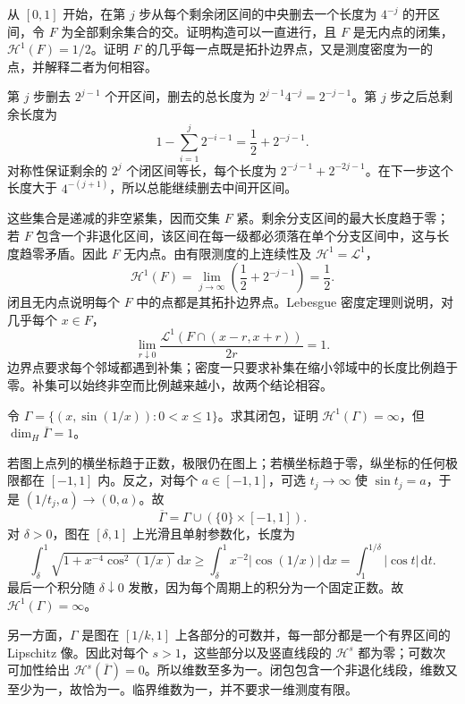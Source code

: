 \begin{exercise}\label{g3:ex:fat-cantor-density}
	从 \([0,1]\) 开始，在第 \(j\) 步从每个剩余闭区间的中央删去一个长度为 \(4^{-j}\) 的开区间，令 \(F\) 为全部剩余集合的交。证明构造可以一直进行，且 \(F\) 是无内点的闭集，\(\mathcal H^1(F)=1/2\)。证明 \(F\) 的几乎每一点既是拓扑边界点，又是测度密度为一的点，并解释二者为何相容。
\end{exercise}
\begin{solution}
	第 \(j\) 步删去 \(2^{j-1}\) 个开区间，删去的总长度为
	\(2^{j-1}4^{-j}=2^{-j-1}\)。第 \(j\) 步之后总剩余长度为
	\[
		1-\sum_{i=1}^j2^{-i-1}=\frac12+2^{-j-1}.
	\]
	对称性保证剩余的 \(2^j\) 个闭区间等长，每个长度为
	\(2^{-j-1}+2^{-2j-1}\)。在下一步这个长度大于 \(4^{-(j+1)}\)，所以总能继续删去中间开区间。

	这些集合是递减的非空紧集，因而交集 \(F\) 紧。剩余分支区间的最大长度趋于零；若 \(F\) 包含一个非退化区间，该区间在每一级都必须落在单个分支区间中，这与长度趋零矛盾。因此 \(F\) 无内点。由有限测度的上连续性及 \(\mathcal H^1=\mathcal L^1\)，
	\[
		\mathcal H^1(F)=\lim_{j\to\infty}\left(\frac12+2^{-j-1}\right)=\frac12.
	\]
	闭且无内点说明每个 \(F\) 中的点都是其拓扑边界点。Lebesgue 密度定理则说明，对几乎每个 \(x\in F\)，
	\[
		\lim_{r\downarrow0}\frac{\mathcal L^1(F\cap(x-r,x+r))}{2r}=1.
	\]
	边界点要求每个邻域都遇到补集；密度一只要求补集在缩小邻域中的长度比例趋于零。补集可以始终非空而比例越来越小，故两个结论相容。
\end{solution}

\begin{exercise}\label{g3:ex:oscillating-graph-length}
	令 \(\Gamma=\{(x,\sin(1/x)):0<x\le1\}\)。求其闭包，证明
	\(\mathcal H^1(\Gamma)=\infty\)，但 \(\dim_H\overline\Gamma=1\)。
\end{exercise}
\begin{solution}
	若图上点列的横坐标趋于正数，极限仍在图上；若横坐标趋于零，纵坐标的任何极限都在 \([-1,1]\) 内。反之，对每个 \(a\in[-1,1]\)，可选 \(t_j\to\infty\) 使 \(\sin t_j=a\)，于是 \((1/t_j,a)\to(0,a)\)。故
	\[
		\overline\Gamma=\Gamma\cup(\{0\}\times[-1,1]).
	\]
	对 \(\delta>0\)，图在 \([\delta,1]\) 上光滑且单射参数化，长度为
	\[
		\int_\delta^1\sqrt{1+x^{-4}\cos^2(1/x)}\,\mathrm dx
		\ge\int_\delta^1x^{-2}|\cos(1/x)|\,\mathrm dx
		=\int_1^{1/\delta}|\cos t|\,\mathrm dt.
	\]
	最后一个积分随 \(\delta\downarrow0\) 发散，因为每个周期上的积分为一个固定正数。故 \(\mathcal H^1(\Gamma)=\infty\)。

	另一方面，\(\Gamma\) 是图在 \([1/k,1]\) 上各部分的可数并，每一部分都是一个有界区间的 Lipschitz 像。因此对每个 \(s>1\)，这些部分以及竖直线段的 \(\mathcal H^s\) 都为零；可数次可加性给出 \(\mathcal H^s(\overline\Gamma)=0\)。所以维数至多为一。闭包包含一个非退化线段，维数又至少为一，故恰为一。临界维数为一，并不要求一维测度有限。
\end{solution}

